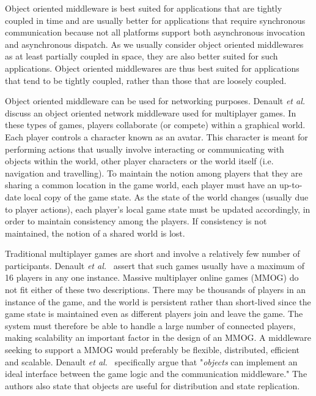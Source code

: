 \documentclass{acm_proc_article-sp}
\def\etal{{\it et al.\/}}
\begin{document}
Object oriented middleware is best suited for applications that are tightly coupled in time and are usually better for applications that require synchronous communication because not all platforms support both asynchronous invocation and asynchronous dispatch.  As we usually consider object oriented middlewares as at least partially coupled in space, they are also better suited for such applications.  Object oriented middlewares are thus best suited for applications that tend to be tightly coupled, rather than those that are loosely coupled.

Object oriented middleware can be used for networking purposes. Denault \etal\ \cite{Denault:2008p8364} discuss an object oriented network middleware used for multiplayer games. In these types of games, players collaborate (or compete) within a graphical world. Each player controls a character known as an avatar. This character is meant for performing actions that usually involve interacting or communicating with objects within the world, other player characters or the world itself (i.e. navigation and travelling). To maintain the notion among players that they are sharing a common location in the game world, each player must have an up-to-date local copy of the game state.  As the state of the world changes (usually due to player actions), each player's local game state must be updated accordingly, in order to maintain consistency among the players.  If consistency is not maintained, the notion of a shared world is lost.

Traditional multiplayer games are short and involve a relatively few number of participants. Denault \etal\ \cite{Denault:2008p8364} assert that such games usually have a maximum of 16 players in any one instance. Massive multiplayer online games (MMOG) do not fit either of these two descriptions.  There may be thousands of players in an instance of the game, and the world is persistent rather than short-lived since the game state is maintained even as different players join and leave the game. The system must therefore be able to handle a large number of connected players, making scalability an important factor in the design of an MMOG. A middleware seeking to support a MMOG would preferably be flexible, distributed, efficient and scalable.  Denault \etal\ \cite{Denault:2008p8364} specifically argue that "\emph{objects} can implement an ideal interface between the game logic and the communication middleware." The authors also state that objects are useful for distribution and state replication.
\end{document}
